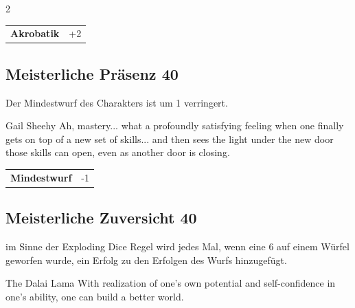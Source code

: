\begin{multicols}{2}
\begin{tcolorbox}
\begin{tabular}{@{}ll@{}}
    \textbf{Akrobatik} & +2\\
\end{tabular}


\end{tcolorbox}

\begin{tcolorbox}
    \subsection*{Meisterliche Präsenz \hfill \small{40 }}
    \tcblower
Der Mindestwurf des Charakters ist um 1 verringert.

\begin{pquote}{Gail Sheehy}
Ah, mastery... what a profoundly satisfying feeling when one finally gets on top of a new set of skills... and then sees the light under the new door those skills can open, even as another door is closing.
\end{pquote}

\vspace{3mm}

\begin{tabular}{@{}ll@{}}
    \textbf{Mindestwurf} & -1\\
\end{tabular}


\end{tcolorbox}

\begin{tcolorbox}
    \subsection*{Meisterliche Zuversicht \hfill \small{40 }}
    \tcblower
im Sinne der Exploding Dice Regel wird jedes Mal, wenn eine 6 auf einem Würfel geworfen wurde, ein Erfolg zu den Erfolgen des Wurfs hinzugefügt.

\begin{pquote}{The Dalai Lama}
With realization of one’s own potential and self-confidence in one’s ability, one can build a better world.
\end{pquote}


\end{tcolorbox}
\end{multicols}

